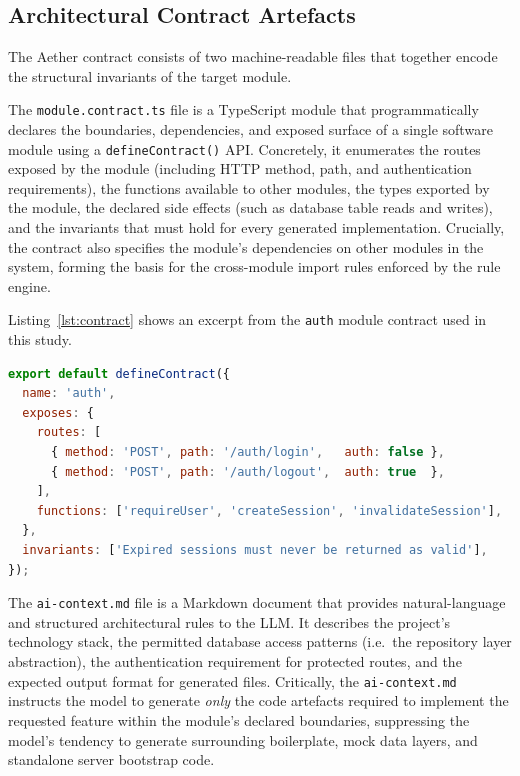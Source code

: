 \documentclass[review,12pt,3p]{elsarticle}
\begin{document}
\subsection{Architectural Contract Artefacts}

The Aether contract consists of two machine-readable files that together encode the
structural invariants of the target module.

The \texttt{module.contract.ts} file is a TypeScript module that programmatically declares
the boundaries, dependencies, and exposed surface of a single software module using a
\texttt{defineContract()} API. Concretely, it enumerates the routes exposed by the module
(including HTTP method, path, and authentication requirements), the functions available to
other modules, the types exported by the module, the declared side effects (such as database
table reads and writes), and the invariants that must hold for every generated implementation.
Crucially, the contract also specifies the module's dependencies on other modules in the
system, forming the basis for the cross-module import rules enforced by the rule engine.


Listing~\ref{lst:contract} shows an excerpt from the \texttt{auth} module contract used
in this study.

\begin{lstlisting}[language=JavaScript, caption={Excerpt from \texttt{modules/auth/module.contract.ts}}, label=lst:contract, basicstyle=\small\ttfamily, frame=single, breaklines=true]
export default defineContract({
  name: 'auth',
  exposes: {
    routes: [
      { method: 'POST', path: '/auth/login',   auth: false },
      { method: 'POST', path: '/auth/logout',  auth: true  },
    ],
    functions: ['requireUser', 'createSession', 'invalidateSession'],
  },
  invariants: ['Expired sessions must never be returned as valid'],
});
\end{lstlisting}

The \texttt{ai-context.md} file is a Markdown document that provides natural-language and
structured architectural rules to the LLM. It describes the project's technology stack,
the permitted database access patterns (i.e.\ the repository layer abstraction), the
authentication requirement for protected routes, and the expected output format for
generated files. Critically, the \texttt{ai-context.md} instructs the model to generate
\emph{only} the code artefacts required to implement the requested feature within the
module's declared boundaries, suppressing the model's tendency to generate surrounding
boilerplate, mock data layers, and standalone server bootstrap code.
\end{document}
